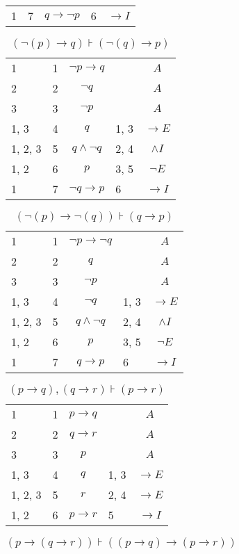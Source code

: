 \documentclass{article}
\begin{document}
\begin{table}[htbp]
\begin{tabular}{lllll}
{1} & 7 & $$q→ ¬p$$ & {6} & $$→I$$ \\
\end{tabular}
\end{table}\begin{table}[htbp]\caption*{$(¬(p) → q) ⊦ (¬(q) → p)$}\centering\begin{tabular}{lllll}
{1} & 1 & $$¬p→q$$ & {} & $$A$$ \\
{2} & 2 & $$¬q$$ & {} & $$A$$ \\
{3} & 3 & $$¬p$$ & {} & $$A$$ \\
{1, 3} & 4 & $$q$$ & {1, 3} & $$→E$$ \\
{1, 2, 3} & 5 & $$q∧ ¬q$$ & {2, 4} & $$∧I$$ \\
{1, 2} & 6 & $$p$$ & {3, 5} & $$¬E$$ \\
{1} & 7 & $$¬q→p$$ & {6} & $$→I$$ \\
\end{tabular}
\end{table}\begin{table}[htbp]\caption*{$(¬(p) → ¬(q)) ⊦ (q → p)$}\centering\begin{tabular}{lllll}
{1} & 1 & $$¬p→ ¬q$$ & {} & $$A$$ \\
{2} & 2 & $$q$$ & {} & $$A$$ \\
{3} & 3 & $$¬p$$ & {} & $$A$$ \\
{1, 3} & 4 & $$¬q$$ & {1, 3} & $$→E$$ \\
{1, 2, 3} & 5 & $$q∧ ¬q$$ & {2, 4} & $$∧I$$ \\
{1, 2} & 6 & $$p$$ & {3, 5} & $$¬E$$ \\
{1} & 7 & $$q→p$$ & {6} & $$→I$$ \\
\end{tabular}
\end{table}\begin{table}[htbp]\caption*{$(p → q),(q → r) ⊦ (p → r)$}\centering\begin{tabular}{lllll}
{1} & 1 & $$p→q$$ & {} & $$A$$ \\
{2} & 2 & $$q→r$$ & {} & $$A$$ \\
{3} & 3 & $$p$$ & {} & $$A$$ \\
{1, 3} & 4 & $$q$$ & {1, 3} & $$→E$$ \\
{1, 2, 3} & 5 & $$r$$ & {2, 4} & $$→E$$ \\
{1, 2} & 6 & $$p→r$$ & {5} & $$→I$$ \\
\end{tabular}
\end{table}\begin{table}[htbp]\caption*{$(p → (q → r)) ⊦ ((p → q) → (p → r))$}\centering\begin{tabular}{lllll}

\end{tabular}
\end{table}
\end{document}
